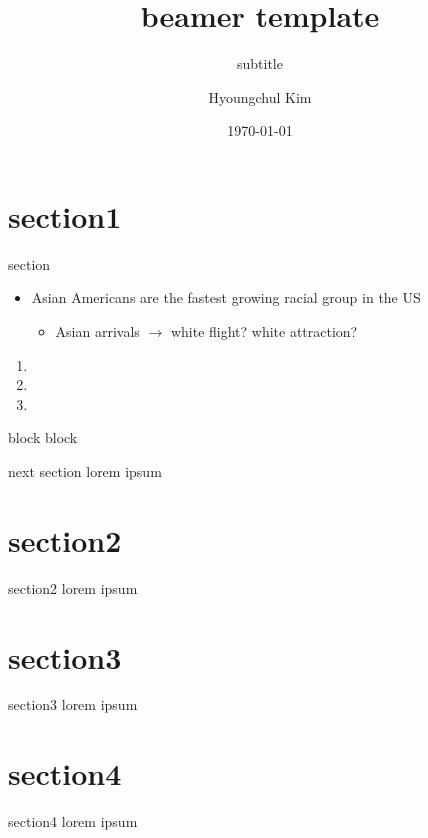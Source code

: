 \documentclass[10pt]{beamer}
\title{beamer template}
\subtitle{subtitle}
\author{Hyoungchul Kim}
\date{\today}
\institute{The Wharton School, University of Pennsylvania}
\begin{document}
\begin{frame}
\titlepage
\end{frame}


\section{section1}
\begin{frame}{section}

\begin{itemize}
\item Asian Americans are the fastest growing racial group in the US
    \begin{itemize}
        \item Asian arrivals $\rightarrow$ white flight? white attraction?
    \end{itemize}
\end{itemize}

\begin{enumerate}
    \item 
    \item 
    \item 
\end{enumerate}

\begin{block}{block}
    block
\end{block}

\hyperlink{contents}{}

\end{frame}

\begin{frame}{next section}\label{contents}
    lorem ipsum
\end{frame}

\section{section2}

\begin{frame}{section2}
    lorem ipsum
\end{frame}

\section{section3}

\begin{frame}{section3}
    lorem ipsum
\end{frame}

\section{section4}

\begin{frame}{section4}
    lorem ipsum
\end{frame}
\end{document}
